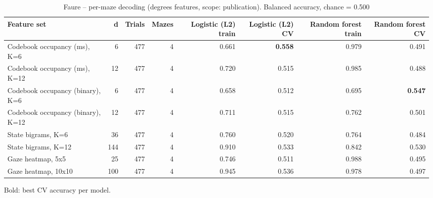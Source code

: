 \begin{table}[t]
\centering
\caption{Faure -- per-maze decoding (degrees features, scope: publication). Balanced accuracy, chance = 0.500}
\label{tab:permaze_Faure}
\begin{tabular}{lrrrrrrr}
\toprule
Feature set & d & Trials & Mazes & Logistic (L2) train & Logistic (L2) CV & Random forest train & Random forest CV \\
\midrule
Codebook occupancy (ms), K=6 & 6 & 477 & 4 & 0.661 & \textbf{0.558} & 0.979 & 0.491 \\
Codebook occupancy (ms), K=12 & 12 & 477 & 4 & 0.720 & 0.515 & 0.985 & 0.488 \\
Codebook occupancy (binary), K=6 & 6 & 477 & 4 & 0.658 & 0.512 & 0.695 & \textbf{0.547} \\
Codebook occupancy (binary), K=12 & 12 & 477 & 4 & 0.711 & 0.515 & 0.762 & 0.501 \\
State bigrams, K=6 & 36 & 477 & 4 & 0.760 & 0.520 & 0.764 & 0.484 \\
State bigrams, K=12 & 144 & 477 & 4 & 0.910 & 0.533 & 0.842 & 0.530 \\
Gaze heatmap, 5x5 & 25 & 477 & 4 & 0.746 & 0.511 & 0.988 & 0.495 \\
Gaze heatmap, 10x10 & 100 & 477 & 4 & 0.945 & 0.536 & 0.978 & 0.497 \\
\bottomrule
\end{tabular}
\par\smallskip
{\footnotesize Bold: best CV accuracy per model.}
\end{table}
